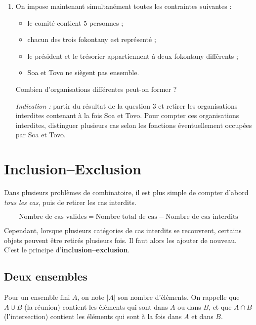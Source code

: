 \begin{enumerate}
    \item On impose maintenant simultanément toutes les contraintes suivantes :
    \begin{itemize}
        \item le comité contient \(5\) personnes ;
        \item chacun des trois fokontany est représenté ;
        \item le président et le trésorier appartiennent à deux fokontany différents ;
        \item Soa et Tovo ne siègent pas ensemble.
    \end{itemize}
    
    Combien d'organisations différentes peut-on former ?

    \emph{Indication :} partir du résultat de la question 3 et retirer les
    organisations interdites contenant à la fois Soa et Tovo. Pour compter ces
    organisations interdites, distinguer plusieurs cas selon les fonctions
    éventuellement occupées par Soa et Tovo.

\end{enumerate}

\noindent
{}
\quad
{}
\quad
{}
\quad
{}
\quad
{}


\section{Inclusion--Exclusion}

Dans plusieurs problèmes de combinatoire, il est plus simple de compter d'abord
\emph{tous les cas}, puis de retirer les cas interdits.

\[
\boxed{
\text{Nombre de cas valides}
=
\text{Nombre total de cas}
-
\text{Nombre de cas interdits}
}
\]

Cependant, lorsque plusieurs catégories de cas interdits se recouvrent,
certains objets peuvent être retirés plusieurs fois. Il faut alors les ajouter
de nouveau. C'est le principe d'\textbf{inclusion--exclusion}.

\subsection{Deux ensembles}

Pour un ensemble fini \(A\), on note \(|A|\) son nombre d’éléments. On rappelle que
\(A\cup B\) (la réunion) contient les éléments qui sont dans \(A\) ou dans \(B\), et que
\(A\cap B\) (l’intersection) contient les éléments qui sont à la fois dans \(A\) et dans \(B\).

